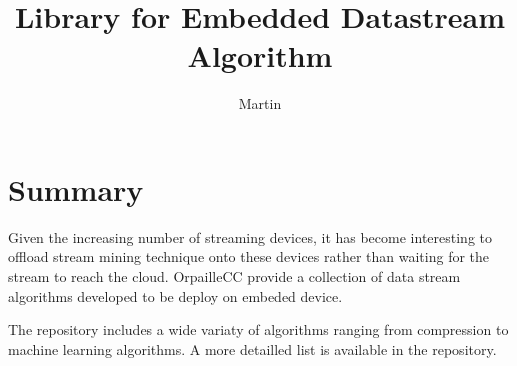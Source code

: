 \documentclass{article}
\title{Library for Embedded Datastream Algorithm}
\author{Martin}
\begin{document}
\maketitle
\section{Summary}
Given the increasing number of streaming devices, it has become interesting to offload 
stream mining technique onto these devices rather than waiting for the stream to reach the cloud.
OrpailleCC provide a collection of data stream algorithms developed to be deploy on embeded device.

The repository includes a wide variaty of algorithms ranging from compression \cite{ltc} to machine learning \cite{mc-nn} algorithms.
A more detailled list is available in the repository.









\end{document}
